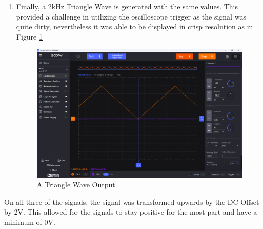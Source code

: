 \documentclass[12pt]{article}
\begin{document}
\begin{enumerate}
	\item Finally, a 2kHz Triangle Wave is generated with the same values. This
	      provided a challenge in utilizing the oscilloscope trigger as the signal was
	      quite dirty, nevertheless it was able to be displayed in crisp resolution as
	      in Figure \ref{fig:trianglewave}


	      \begin{figure}[H]
		      \centering
		      \includegraphics[width=14cm]{04_03}
		      \caption{A Triangle Wave Output}
		      \label{fig:trianglewave}
	      \end{figure}
\end{enumerate}

On all three of the signals, the signal was transformed upwards by the DC Offset
by 2V. This allowed for the signals to stay positive for the most part and have
a minimum of 0V.
\end{document}

